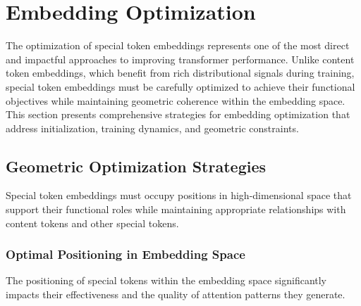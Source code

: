 
\section{Embedding Optimization}

The optimization of special token embeddings represents one of the most direct and impactful approaches to improving transformer performance. Unlike content token embeddings, which benefit from rich distributional signals during training, special token embeddings must be carefully optimized to achieve their functional objectives while maintaining geometric coherence within the embedding space. This section presents comprehensive strategies for embedding optimization that address initialization, training dynamics, and geometric constraints.

\subsection{Geometric Optimization Strategies}

Special token embeddings must occupy positions in high-dimensional space that support their functional roles while maintaining appropriate relationships with content tokens and other special tokens.
\begin{comment}
Feedback: Before linking to the code, it's crucial to explain the core intuition. For example: "The geometry of the embedding space matters. For a [CLS] token to effectively summarize a sequence, its embedding should ideally be 'central' to the content tokens it's summarizing. For different special tokens (e.g., [TASK_A] and [TASK_B]) to be clearly distinguishable, their embeddings should be far apart, or 'orthogonal.' Geometric optimization involves adding terms to the loss function that explicitly encourage these desired spatial relationships, rather than hoping they emerge on their own."
\end{comment}

\subsubsection{Optimal Positioning in Embedding Space}

The positioning of special tokens within the embedding space significantly impacts their effectiveness and the quality of attention patterns they generate.

